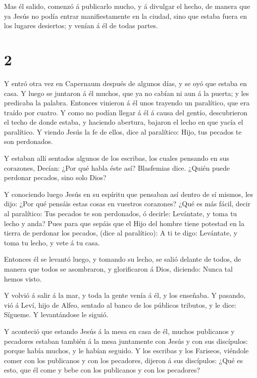  Mas él salido, comenzó á publicarlo mucho, y á divulgar el
hecho, de manera que ya Jesús no podía entrar manifiestamente en la
ciudad, sino que estaba fuera en los lugares desiertos; y venían á él de
todas partes.

\hypertarget{section-1}{%
\section{2}\label{section-1}}

 Y entró otra vez en Capernaum después de algunos días, y se
oyó que estaba en casa.  Y luego se juntaron á él muchos,
que ya no cabían ni aun á la puerta; y les predicaba la palabra.
 Entonces vinieron á él unos trayendo un paralítico, que era
traído por cuatro.  Y como no podían llegar á él á causa del
gentío, descubrieron el techo de donde estaba, y haciendo abertura,
bajaron el lecho en que yacía el paralítico.  Y viendo Jesús
la fe de ellos, dice al paralítico: Hijo, tus pecados te son perdonados.

 Y estaban allí sentados algunos de los escribas, los cuales
pensando en sus corazones,  Decían: ¿Por qué habla éste así?
Blasfemias dice. ¿Quién puede perdonar pecados, sino solo Dios?

 Y conociendo luego Jesús en su espíritu que pensaban así
dentro de sí mismos, les dijo: ¿Por qué pensáis estas cosas en vuestros
corazones?  ¿Qué es más fácil, decir al paralítico: Tus
pecados te son perdonados, ó decirle: Levántate, y toma tu lecho y anda?
 Pues para que sepáis que el Hijo del hombre tiene potestad
en la tierra de perdonar los pecados, (dice al paralítico):
 A ti te digo: Levántate, y toma tu lecho, y vete á tu
casa.

 Entonces él se levantó luego, y tomando su lecho, se salió
delante de todos, de manera que todos se asombraron, y glorificaron á
Dios, diciendo: Nunca tal hemos visto.

 Y volvió á salir á la mar, y toda la gente venía á él, y
los enseñaba.  Y pasando, vió á Leví, hijo de Alfeo,
sentado al banco de los públicos tributos, y le dice: Sígueme. Y
levantándose le siguió.

 Y aconteció que estando Jesús á la mesa en casa de él,
muchos publicanos y pecadores estaban también á la mesa juntamente con
Jesús y con sus discípulos: porque había muchos, y le habían seguido.
 Y los escribas y los Fariseos, viéndole comer con los
publicanos y con los pecadores, dijeron á sus discípulos: ¿Qué es esto,
que él come y bebe con los publicanos y con los pecadores?

